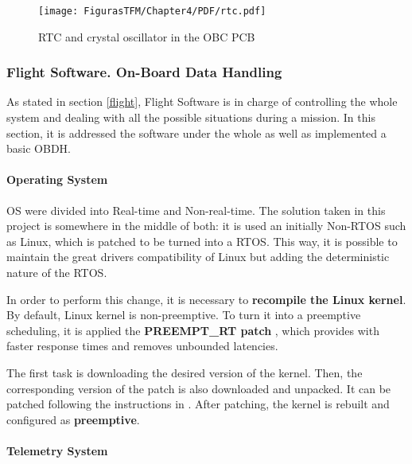 		\begin{figure} [H]
			\centering
			\texttt{[image: FigurasTFM/Chapter4/PDF/rtc.pdf]}
			\caption{\acrshort{RTC} and crystal oscillator in the \acrshort{OBC} \acrshort{PCB}}      		\label{rtcpic}
			\vspace{-2cm}
\end{figure}


\newpage

\subsubsection{Flight Software. On-Board Data Handling}

As stated in section \ref{flight}, Flight Software is in charge of controlling the whole system and dealing with all the possible situations during a mission. In this section, it is addressed the software under the whole  as well as implemented a basic \acrshort{OBDH}.


\vspace{-0.5cm}
\paragraph{Operating System} \label{rtosdes}

\acrshort{OS} were divided into Real-time and Non-real-time. The solution taken in this project is somewhere in the middle of both: it is used an initially Non-\acrshort{RTOS} such as Linux, which is patched to be turned into a \acrshort{RTOS}. This way, it is possible to maintain the great drivers compatibility of Linux but adding the deterministic nature of the \acrshort{RTOS}.

In order to perform this change, it is necessary to \textbf{recompile the Linux kernel}. By default, Linux kernel is non-preemptive. To turn it into a preemptive scheduling, it is applied the \textbf{PREEMPT\_RT patch} \cite{linuxrtos}, which provides with faster response times and removes unbounded latencies. 

The first task is downloading the desired version of the kernel. Then, the corresponding version of the patch is also downloaded and unpacked. It can be patched following the instructions in \cite{linuxpat}. After patching, the kernel is rebuilt and configured as \textbf{preemptive}.


\paragraph{Telemetry System}

